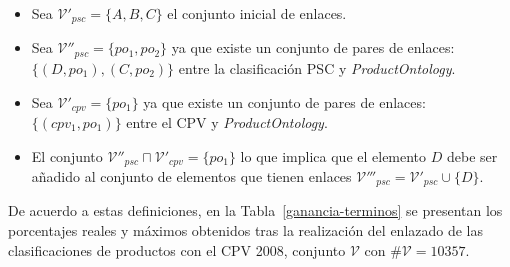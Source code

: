 \begin{itemize}
 \item Sea  $\mathcal{V'}_{psc} = \{A, B, C\}$ el conjunto inicial de enlaces.
 \item Sea  $\mathcal{V''}_{psc} = \{po_{1}, po_{2} \}$ ya que existe un conjunto de pares de enlaces: $\{ (D,po_{1}), (C,po_{2})\}$ entre la 
clasificación PSC y \textit{ProductOntology}.
 \item Sea  $\mathcal{V'}_{cpv} = \{po_{1}\}$ ya que existe un conjunto de pares de enlaces: $\{ (cpv_{1},po_{1})\}$ entre el CPV 
y \textit{ProductOntology}.
 \item El conjunto $\mathcal{V''}_{psc} \sqcap \mathcal{V'}_{cpv} = \{po_{1}\}$ lo que implica que el elemento $D$ debe 
ser añadido al conjunto de elementos que tienen enlaces $\mathcal{V'''}_{psc} = \mathcal{V'}_{psc} \cup \{D\}$.
\end{itemize}


De acuerdo a estas definiciones, en la Tabla~\ref{ganancia-terminos} se presentan los porcentajes reales y máximos obtenidos 
tras la realización del enlazado de las clasificaciones de productos con el CPV 2008, conjunto $\mathcal{V}$ con $\#\mathcal{V} = 10357$.


